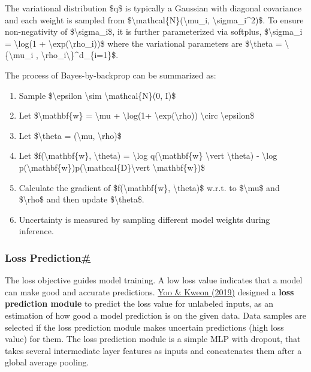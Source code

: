 The variational distribution \$q\$ is typically a Gaussian with diagonal covariance and each weight is sampled from \$\textbackslash mathcal\{N\}(\textbackslash mu\_i, \textbackslash sigma\_i\^{}2)\$. To ensure non-negativity of \$\textbackslash sigma\_i\$, it is further parameterized via softplus, \$\textbackslash sigma\_i = \textbackslash log(1 + \textbackslash exp(\textbackslash rho\_i))\$ where the variational parameters are \$\textbackslash theta = \textbackslash\{\textbackslash mu\_i , \textbackslash rho\_i\textbackslash\}\^{}d\_\{i=1\}\$.

The process of Bayes-by-backprop can be summarized as:

\begin{enumerate}
\tightlist
\item
  Sample \$\textbackslash epsilon \textbackslash sim \textbackslash mathcal\{N\}(0, I)\$
\item
  Let \$\textbackslash mathbf\{w\} = \textbackslash mu + \textbackslash log(1+ \textbackslash exp(\textbackslash rho)) \textbackslash circ \textbackslash epsilon\$
\item
  Let \$\textbackslash theta = (\textbackslash mu, \textbackslash rho)\$
\item
  Let \$f(\textbackslash mathbf\{w\}, \textbackslash theta) = \textbackslash log q(\textbackslash mathbf\{w\} \textbackslash vert \textbackslash theta) - \textbackslash log p(\textbackslash mathbf\{w\})p(\textbackslash mathcal\{D\}\textbackslash vert \textbackslash mathbf\{w\})\$
\item
  Calculate the gradient of \$f(\textbackslash mathbf\{w\}, \textbackslash theta)\$ w.r.t. to \$\textbackslash mu\$ and \$\textbackslash rho\$ and then update \$\textbackslash theta\$.
\item
  Uncertainty is measured by sampling different model weights during inference.
\end{enumerate}

\subsubsection{\texorpdfstring{Loss Prediction\hyperref[loss-prediction]{\#}}{Loss Prediction\#}}\label{loss-prediction}

The loss objective guides model training. A low loss value indicates that a model can make good and accurate predictions. \href{https://arxiv.org/abs/1905.03677}{Yoo \& Kweon (2019)} designed a \textbf{loss prediction module} to predict the loss value for unlabeled inputs, as an estimation of how good a model prediction is on the given data. Data samples are selected if the loss prediction module makes uncertain predictions (high loss value) for them. The loss prediction module is a simple MLP with dropout, that takes several intermediate layer features as inputs and concatenates them after a global average pooling.

